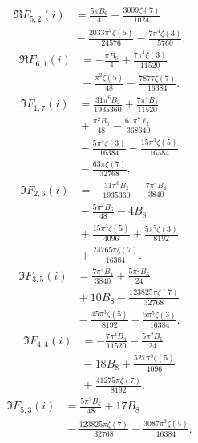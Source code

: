 \begin{align*}
\Re F_{5,2}(i) &=\frac{5 \pi B_{6}}{4}-\frac{3009 \zeta\left(7\right)}{1024} \\
 &{}-\frac{2033 \pi^{2} \zeta\left(5\right)}{24576}-\frac{7 \pi^{4} \zeta\left(3\right)}{5760}.
\end{align*}
\begin{align*}
\Re F_{6,1}(i) &=-\frac{\pi B_{6}}{4}+\frac{7 \pi^{4} \zeta\left(3\right)}{11520} \\
 &{}+\frac{\pi^{2} \zeta\left(5\right)}{48}+\frac{7877 \zeta\left(7\right)}{16384}.
\end{align*}
\begin{align*}
\Im F_{1,7}(i) &=\frac{31 \pi^{6} B_{2}}{1935360}+\frac{7 \pi^{4} B_{4}}{11520} \\
 &{}+\frac{\pi^{2} B_{6}}{48}-\frac{61 \pi^{7} \ell_{2}}{368640} \\
 &{}-\frac{5 \pi^{5} \zeta\left(3\right)}{16384}-\frac{15 \pi^{3} \zeta\left(5\right)}{16384} \\
 &{}-\frac{63 \pi \zeta\left(7\right)}{32768}.
\end{align*}
\begin{align*}
\Im F_{2,6}(i) &=-\frac{31 \pi^{6} B_{2}}{1935360}-\frac{7 \pi^{4} B_{4}}{3840} \\
 &{}-\frac{5 \pi^{2} B_{6}}{48}-4 B_{8} \\
 &{}+\frac{15 \pi^{3} \zeta\left(5\right)}{4096}+\frac{5 \pi^{5} \zeta\left(3\right)}{8192} \\
 &{}+\frac{24765 \pi \zeta\left(7\right)}{16384}.
\end{align*}
\begin{align*}
\Im F_{3,5}(i) &=\frac{7 \pi^{4} B_{4}}{3840}+\frac{5 \pi^{2} B_{6}}{24} \\
 &{}+10 B_{8}-\frac{123825 \pi \zeta\left(7\right)}{32768} \\
 &{}-\frac{45 \pi^{3} \zeta\left(5\right)}{8192}-\frac{5 \pi^{5} \zeta\left(3\right)}{16384}.
\end{align*}
\begin{align*}
\Im F_{4,4}(i) &=-\frac{7 \pi^{4} B_{4}}{11520}-\frac{5 \pi^{2} B_{6}}{24} \\
 &{}-18 B_{8}+\frac{527 \pi^{3} \zeta\left(5\right)}{4096} \\
 &{}+\frac{41275 \pi \zeta\left(7\right)}{8192}.
\end{align*}
\begin{align*}
\Im F_{5,3}(i) &=\frac{5 \pi^{2} B_{6}}{48}+17 B_{8} \\
 &{}-\frac{123825 \pi \zeta\left(7\right)}{32768}-\frac{3087 \pi^{3} \zeta\left(5\right)}{16384}.
\end{align*}
